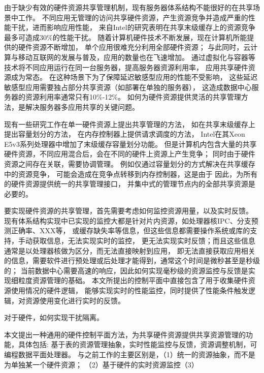 \iffalse

由于缺少有效的硬件资源共享管理机制，现有服务器体系结构不能很好的在共享场景中工作。
不同应用无管理的访问共享硬件资源，产生资源竞争并造成严重的性能干扰，进而影响应用性能，
来自Intel的研究\cite{intel}表明在共享末级缓存上的资源竞争最多可造成30\%的性能干扰。
随着计算机硬件技术不断发展，现在计算机所能提供的硬件资源不断增加，
单个应用很难充分利用全部硬件资源；
与此同时，云计算与移动互联网的发展与普及，应用的数量也在飞速增加。
通过虚拟化与容器等技术将不同应用运行在同一台服务器，提高服务器资源利用率，
应用共享硬件资源成为常态。
在这种场景下为了保障延迟敏感型应用的性能不受影响，
这些延迟敏感型应用需要独占部分共享资源（如部署在单独的服务器\cite{}），
这造成数据中心服务器的资源利用率通常只有10\%-12\%。
如何为硬件资源提供灵活的共享管理方法，是解决服务器多应用共享的关键问题。


现有一些研究工作在单一硬件资源上提出共享管理的方法，
如在共享末级缓存上提出容量划分的方法\cite{}，
在内存控制器上提供请求调度的方法\cite{}，
Intel在其Xeon E5v3系列处理器中增加了末级缓存容量划分功能。
但是计算机内包含大量的共享硬件资源，不同应用混合后，会在不同的硬件上资源上产生竞争；
同时由于硬件资源之间存在关联，需要协调管理。
例如仅通过容量划分的方式解决在共享缓存中的资源竞争，
可能会造成在竞争点转移到内存控制器，这是由于
因此，为所有的硬件资源提供统一的共享管理接口，
并集中式的管理节点内的全部共享资源是必要的。

%
要实现硬件资源的共享管理，首先需要考虑如何监控资源用量，以及实时反馈。 %
现有体系结构实现中已实现的监控大都是针对片内资源，如处理器核IPC、分支预测正确率、XXX等，
或缓存缺失率等信息，但这些信息都需要操作系统或库的支持，手动获取信息，无法实现实时的监控，
更无法实现实时反馈；而且这些信息通常是以处理器核做为区分，而无法直接映射到应用，
即无法直接获取应用相关的信息，需要软件进行预处理或后处理才能得到，通常这个时间是微秒甚至是秒级的；
当前数据中心需要高速的响应，因此如何实现毫秒级的资源监控与反馈是实现细粒度资源管理的基础。
本文所提出的控制平面中直接包含了用于收集硬件资源使用情况的硬件逻辑，
能够实现实时的性能监控，同时提供了性能条件触发逻辑，对资源使用变化进行实时的反馈。

对于硬件，如何实现干扰隔离。 %

本文提出一种通用的硬件控制平面方法，为共享硬件资源提供共享资源管理的功能，具体包括:
基于表的资源管理抽象，实时性能监控与反馈，资源调整机制，可编程数据平面处理器。
与之前工作的主要区别是，（1）统一的资源抽象，而不是为单独某一个硬件资源；
（2）基于硬件的实时资源监控（3）

